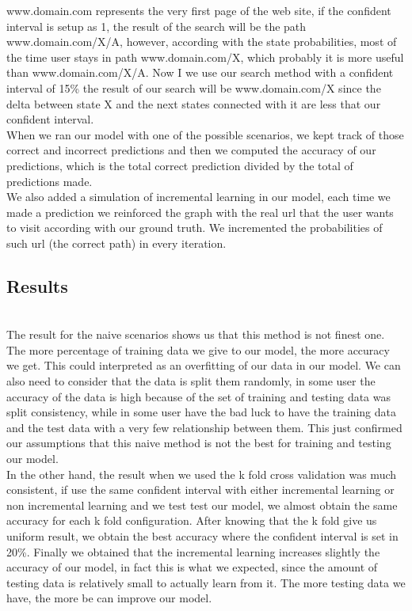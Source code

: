 www.domain.com represents the very first page of the web site, if the confident interval is setup as 1, the result of the search will be the path www.domain.com/X/A, however, according with the state probabilities, most of the time user stays in path www.domain.com/X, which probably it is more useful than www.domain.com/X/A. Now I we use our search method with a confident interval of 15\% the result of our search will be www.domain.com/X since the delta between state X and the next states connected with it are less that our confident interval.
\\[2ex]
When we ran our model with one of the possible scenarios, we kept track of those correct and incorrect predictions and then we computed the accuracy of our predictions, which is the total correct prediction divided by the total of predictions made. 
\\[2ex]
We also added a simulation of incremental learning in our model, each time we made a prediction we reinforced the graph with the real url that the user wants to visit according with our ground truth. We incremented the probabilities of such url (the correct path) in every iteration.

\subsection{Results}\label{subsec:results}
\\[2ex]
The result for the naive scenarios shows us that this method is not finest one. The more percentage of training data we give to our model, the more accuracy we get. This could interpreted as an overfitting of our data in our model. We can also need to consider that the data is split them randomly, in some user the accuracy of the data is high because of the set of training and testing data was split consistency, while in some user have the bad luck to have the training data and the test data with a very few relationship between them. This just confirmed our assumptions that this naive method is not the best for training and testing our model.
\\[2ex]
In the other hand, the result when we used the k fold cross validation was much consistent, if use the same confident interval with either incremental learning or non incremental learning and we test test our model, we almost obtain the same accuracy for each k fold configuration. After knowing that the k fold give us uniform result, we obtain the best accuracy where the confident interval is set in 20\%. Finally we obtained that the incremental learning increases slightly the accuracy of our model, in fact this is what we expected, since the amount of testing data is relatively small to actually learn from it. The more testing data we have, the more be can improve our model.